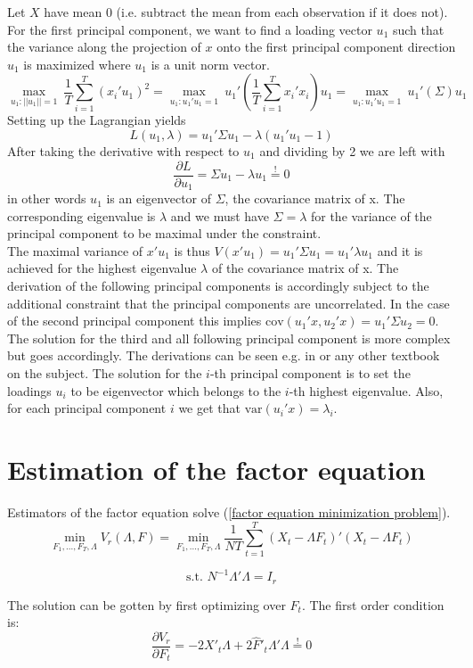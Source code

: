 \documentclass[12pt]{article}
\begin{document}
Let $X$ have mean 0 (i.e. subtract the mean from each observation if it does not).
For the first principal component, we want to find a loading vector $u_1$ such that the variance along the projection of $x$ onto the first principal component direction $u_1$ is maximized where $u_1$ is a unit norm vector. 
$$\underset{u_1: ||u_1|| = 1}{\max} \ \frac{1}{T} \sum_{i=1}^T(x_i'u_1)^2 = \underset{u_1: u_1'u_1 = 1}{\max} \ u_1' ( \frac{1}{T} \sum_{i=1}^T x_i'x_i )u_1 = \underset{u_1: u_1'u_1 = 1}{\max} \ u_1' (\Sigma)u_1$$
Setting up the Lagrangian yields
$$ L(u_1, \lambda) = u_1' \Sigma u_1 - \lambda(u_1'u_1-1)$$
After taking the derivative with respect to $u_1$ and dividing by 2 we are left with
$$\frac{\partial L}{\partial u_1} = \Sigma u_1 -\lambda u_1 \overset{!}{=} 0$$ in other words $u_1$ is an eigenvector of $\Sigma$, the covariance matrix of x. The corresponding eigenvalue is $\lambda$ and we must have $\Sigma = \lambda$ for the variance of the principal component to be maximal under the constraint. \\
The maximal variance of $x'u_1$ is thus $V(x'u_1) = u_1' \Sigma u_1 = u_1' \lambda u_1$ and it is achieved for the highest eigenvalue $\lambda$ of the covariance matrix of x. The derivation of the following principal components is accordingly subject to the additional constraint that the principal components are uncorrelated. In the case of the second principal component this implies $\text{cov}(u_1'x, u_2'x) = u_1' \Sigma u_2 = 0$. The solution for the third and all following principal component is more complex but goes accordingly. The derivations can be seen e.g. in \citet{jolliffe2005principal} or any other textbook on the subject. The solution for the $i$-th principal component is to set the loadings $u_i$ to be eigenvector which belongs to the $i$-th highest eigenvalue. Also, for each principal component $i$ we get that $\text{var}(u_i'x) = \lambda_i$.

\newpage
\section{Estimation of the factor equation}
\label{Estimation of the Factor Equation}
Estimators of the factor equation solve (\ref{factor equation minimization problem}).
$$\min_{F_1, ..., F_T, \Lambda} V_r(\Lambda, F) = \min_{F_1, ..., F_T, \Lambda} \frac{1}{NT} \sum_{t=1}^T (X_t - \Lambda F_t)'(X_t - \Lambda F_t)$$

$$\text{s.t. } N^{-1} \Lambda' \Lambda = I_r$$

The solution can be gotten by first optimizing over $F_t$. The first order condition is: $$\frac{\partial V_r}{\partial F_t} = -2X'_t \Lambda + 2 \hat F'_t \Lambda' \Lambda \overset{!}{=} 0$$
\end{document}
